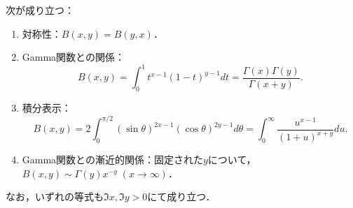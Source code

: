 \documentclass[uplatex,dvipdfmx]{jsreport}
\begin{document}
\begin{theorem}[Beta関数の性質]\label{thm-property-of-Beta-function}
    次が成り立つ：
    \begin{enumerate}
        \item 対称性：$B(x,y)=B(y,x)$．
        \item Gamma関数との関係：
        \[B(x,y)=\int^1_0t^{x-1}(1-t)^{y-1}dt=\frac{\Gamma(x)\Gamma(y)}{\Gamma(x+y)}.\]
        \item 積分表示：
        \[B(x,y)=2\int^{\pi/2}_0(\sin\theta)^{2x-1}(\cos\theta)^{2y-1}d\theta=\int^\infty_0\frac{u^{x-1}}{(1+u)^{x+y}}du.\]
        \item Gamma関数との漸近的関係：固定された$y$について，$B(x,y)\sim\Gamma(y)x^{-y}\;(x\to\infty)$．
    \end{enumerate}
    なお，いずれの等式も$\Im x,\Im y>0$にて成り立つ．
\end{theorem}
\end{document}
